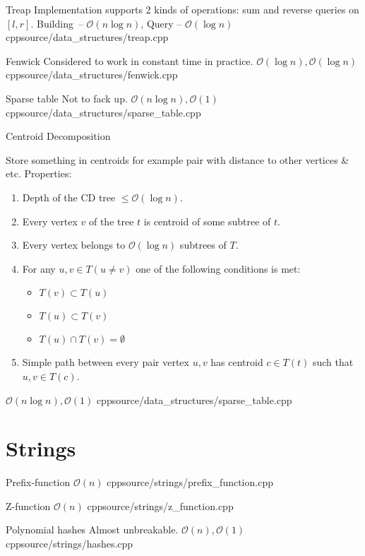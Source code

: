 \documentclass[landscape, 10pt, a4paper, oneside, twocolumn]{extarticle}
\begin{document}
\Algorithm
{Treap}
{Implementation supports 2 kinds of operations: sum and reverse queries on $[l, r]$.}
{Building – $\mathcal{O}(n \log n)$, Query – $\mathcal{O}(\log n)$}
{cpp}{source/data_structures/treap.cpp}

\Algorithm
{Fenwick}
{Considered to work in constant time in practice.}
{$\mathcal{O}(\log n), \mathcal{O}(\log n)$}
{cpp}{source/data_structures/fenwick.cpp}

\Algorithm
{Sparse table}
{Not to fack up.}
{$\mathcal{O}(n \log n), \mathcal{O}(1)$}
{cpp}{source/data_structures/sparse_table.cpp}

\Algorithm
{Centroid Decomposition}
{Store something in centroids for example pair with distance to other vertices & etc.
Properties:
    \begin{enumerate}
        \item Depth of the CD tree $ \leq \mathcal{O}(\log n)$.
        \item Every vertex $v$ of the tree $t$ is centroid of some subtree of $t$.
        \item Every vertex belongs to $\mathcal{O}(\log n)$ subtrees of $T$.
        \item For any $u, v \in T (u \neq v)$ one of the following conditions is met:
            \begin{itemize}
                \item $T(v) \subset T(u)$
                \item $T(u) \subset T(v)$
                \item $T(u) \cap T(v) = \emptyset $
            \end{itemize}
        \item Simple path between every pair vertex $u, v$ has centroid $c \in T(t)$ such that $u, v \in T(c)$. 
    \end{enumerate}
}
{$\mathcal{O}(n \log n), \mathcal{O}(1)$}
{cpp}{source/data_structures/sparse_table.cpp}



\section{Strings}

\Algorithm
{Prefix-function}
{}
{$\mathcal{O}(n)$}
{cpp}{source/strings/prefix_function.cpp}

\Algorithm
{Z-function}
{}
{$\mathcal{O}(n)$}
{cpp}{source/strings/z_function.cpp}

\Algorithm
{Polynomial hashes}
{Almost unbreakable.}
{$\mathcal{O}(n), \mathcal{O}(1)$}
{cpp}{source/strings/hashes.cpp}
\end{document}
